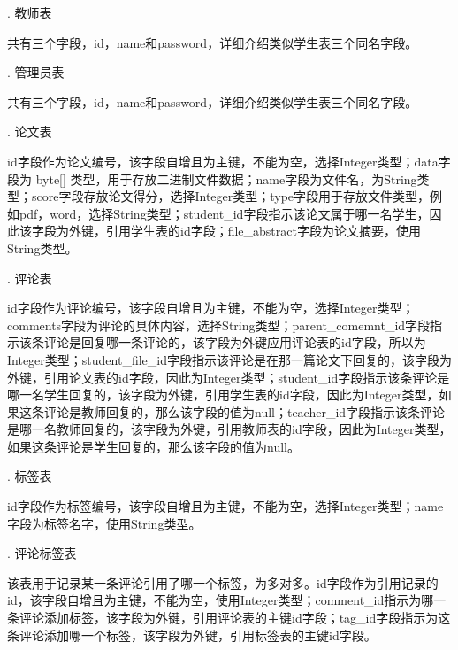 . 教师表

共有三个字段，id，name和password，详细介绍类似学生表三个同名字段。

. 管理员表

共有三个字段，id，name和password，详细介绍类似学生表三个同名字段。

. 论文表

id字段作为论文编号，该字段自增且为主键，不能为空，选择Integer类型；data字段为 byte[] 类型，用于存放二进制文件数据；name字段为文件名，为String类型；score字段存放论文得分，选择Integer类型；type字段用于存放文件类型，例如pdf，word，选择String类型；student\_id字段指示该论文属于哪一名学生，因此该字段为外键，引用学生表的id字段；file\_abstract字段为论文摘要，使用String类型。

. 评论表

id字段作为评论编号，该字段自增且为主键，不能为空，选择Integer类型；comments字段为评论的具体内容，选择String类型；parent\_comemnt\_id字段指示该条评论是回复哪一条评论的，该字段为外键应用评论表的id字段，所以为Integer类型；student\_file\_id字段指示该评论是在那一篇论文下回复的，该字段为外键，引用论文表的id字段，因此为Integer类型；student\_id字段指示该条评论是哪一名学生回复的，该字段为外键，引用学生表的id字段，因此为Integer类型，如果这条评论是教师回复的，那么该字段的值为null；teacher\_id字段指示该条评论是哪一名教师回复的，该字段为外键，引用教师表的id字段，因此为Integer类型，如果这条评论是学生回复的，那么该字段的值为null。

. 标签表

id字段作为标签编号，该字段自增且为主键，不能为空，选择Integer类型；name字段为标签名字，使用String类型。

. 评论标签表

该表用于记录某一条评论引用了哪一个标签，为多对多。id字段作为引用记录的id，该字段自增且为主键，不能为空，使用Integer类型；comment\_id指示为哪一条评论添加标签，该字段为外键，引用评论表的主键id字段；tag\_id字段指示为这条评论添加哪一个标签，该字段为外键，引用标签表的主键id字段。

